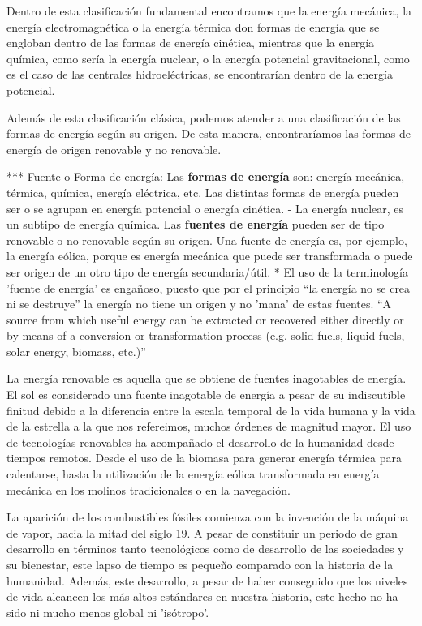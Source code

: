Dentro de esta clasificación fundamental encontramos que la energía mecánica, la energía electromagnética o la energía térmica don formas de energía que se engloban dentro de las formas de energía cinética, mientras que la energía química, como sería la energía nuclear, o la energía potencial gravitacional, como es el caso de las centrales hidroeléctricas, se encontrarían dentro de la energía potencial.

Además de esta clasificación clásica, podemos atender a una clasificación de las formas de energía según su origen. De esta manera, encontraríamos las formas de energía de origen renovable y no renovable.

*** Fuente o Forma de energía:
Las \textbf{formas de energía} son: energía mecánica, térmica, química, energía eléctrica, etc. Las distintas formas de energía pueden ser o se agrupan en energía potencial o energía cinética.
- La energía nuclear, es un subtipo de energía química.
Las \textbf{fuentes de energía} pueden ser de tipo renovable o no renovable según su origen. Una fuente de energía es, por ejemplo, la energía eólica, porque es energía mecánica que puede ser transformada o puede ser origen de un otro tipo de energía secundaria/útil.
* El uso de la terminología 'fuente de energía' es engañoso, puesto que por el principio ``la energía no se crea ni se destruye'' la energía no tiene un origen y no 'mana' de estas fuentes.
``A source from which useful energy can be extracted or recovered either directly or by means of a conversion or transformation process (e.g. solid fuels, liquid fuels, solar energy, biomass, etc.)''

La energía renovable es aquella que se obtiene de fuentes inagotables de energía. El sol es considerado una fuente inagotable de energía a pesar de su indiscutible finitud debido a la diferencia entre la escala temporal de la vida humana y la vida de la estrella a la que nos refereimos, muchos órdenes de magnitud mayor. El uso de tecnologías renovables ha acompañado el desarrollo de la humanidad desde tiempos remotos. Desde el uso de la biomasa para generar energía térmica para calentarse, hasta la utilización de la energía eólica transformada en energía mecánica en los molinos tradicionales o en la navegación.


La aparición de los combustibles fósiles comienza con la invención de la máquina de vapor, hacia la mitad del siglo 19. A pesar de constituir un periodo de gran desarrollo en términos tanto tecnológicos como de desarrollo de las sociedades y su bienestar, este lapso de tiempo es pequeño comparado con la historia de la humanidad. Además, este desarrollo, a pesar de haber conseguido que los niveles de vida alcancen los más altos estándares en nuestra historia, este hecho no ha sido ni mucho menos global ni 'isótropo'. 


